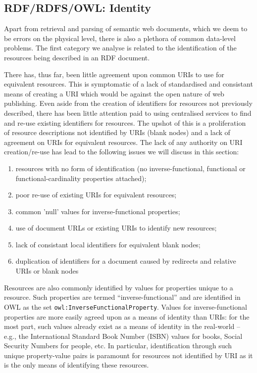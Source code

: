 \documentclass{llncs}
\begin{document}
\subsection{RDF/RDFS/OWL: Identity}
Apart from retrieval and parsing of semantic web documents, which we deem to be errors on the physical level, there is also a plethora of common data-level problems. The first category we analyse is related to the identification of the resources being described in an RDF document.

There has, thus far, been little agreement upon common URIs to use for equivalent resources. This is symptomatic of a lack of standardised and consistant means of creating a URI which would be against the open nature of web publishing. 
Even aside from the creation of identifiers for resources not previously described, there has been little attention paid to using centralised services to find and re-use existing identifiers for resources.
The upshot of this is a proliferation of resource descriptions not identified by URIs (blank nodes) and a lack of agreement on URIs for equivalent resources.
The lack of any authority on URI creation/re-use has lead to the following issues we will discuss in this section:

\begin{enumerate}
\item resources with no form of identification (no inverse-functional, functional or functional-cardinality properties attached);
\item poor re-use of existing URIs for equivalent resources;
\item common 'null' values for inverse-functional properties;
\item use of document URLs or existing URIs to identify new resources;
\item lack of consistant local identifiers for equivalent blank nodes;
\item duplication of identifiers for a document caused by redirects and relative URIs or blank nodes
\end{enumerate}

Resources are also commonly identified by values for properties unique to a resource.
Such properties are termed ``inverse-functional'' and are identified in OWL as the set {\tt owl:InverseFunctionalProperty}.
Values for inverse-functional properties are more easily agreed upon as a means of identity than URIs: for the most part, such values already exist as a means of identity in the real-world -- e.g., the International Standard Book Number (ISBN) values for books, Social Security Numbers for people, etc.
In particular, identification through such unique property-value pairs is paramount for resources not identified by URI as it is the only means of identifying these resources.
\end{document}
